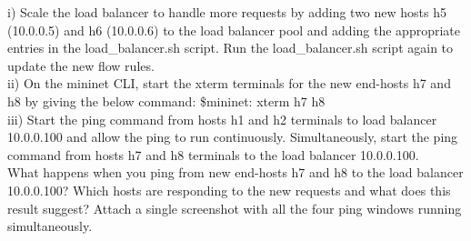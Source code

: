 \documentclass[a4paper]{article}
\begin{document}
i) Scale the load balancer to handle more requests by adding two new hosts h5 (10.0.0.5) and h6 (10.0.0.6) to the load balancer pool and adding the appropriate entries in the load\_balancer.sh script. Run the load\_balancer.sh script again to update the new flow rules. \\

ii) On the mininet CLI, start the xterm terminals for the new end-hosts h7 and h8 by giving the below command: \$mininet: xterm h7 h8 \\

iii) Start the ping command from hosts h1 and h2 terminals to load balancer 10.0.0.100 and allow the ping to run continuously. Simultaneously, start the ping command from hosts h7 and h8 terminals to the load balancer 10.0.0.100. \\

What happens when you ping from new end-hosts h7 and h8 to the load balancer 10.0.0.100? Which hosts are responding to the new requests and what does this result suggest? Attach a single screenshot with all the four ping windows running simultaneously.
\end{document}
